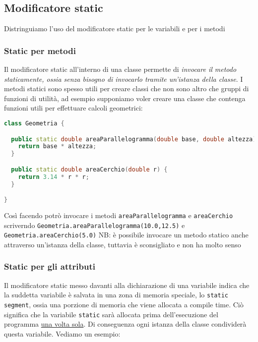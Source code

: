 \subsection{Modificatore static}\label{static}
Distringuiamo l'uso del modificatore static per le variabili e per i metodi

\subsubsection{Static per metodi}
Il modificatore static all'interno di una classe permette di \textit{invocare il metodo staticamente, ossia senza bisogno di invocarlo tramite un'istanza della classe}. I metodi statici sono spesso utili per creare classi che non sono altro che gruppi di funzioni di utilità, ad esempio supponiamo voler creare una classe che contenga funzioni utili per effettuare calcoli geometrici:

\vskip3mm
\begin{lstlisting}[language = c++, frame = none]
class Geometria {

  public static double areaParallelogramma(double base, double altezza) {
    return base * altezza;
  }

  public static double areaCerchio(double r) {
    return 3.14 * r * r;
  }

}
\end{lstlisting}
\vskip3mm
Così facendo potrò invocare i metodi \verb|areaParallelogramma| e \verb|areaCerchio| scriverndo \verb|Geometria.areaParallelogramma(10.0,12.5)| e \verb|Geometria.areaCerchio(5.0)|
\vskip3mm
NB: è possibile invocare un metodo statico anche attraverso un'istanza della classe, tuttavia è sconsigliato e non ha molto senso

\subsubsection{Static per gli attributi}
Il modificatore static messo davanti alla dichiarazione di una variabile indica che la suddetta variabile è salvata in una zona di memoria speciale, lo \verb|static segment|, ossia una porzione di memoria che viene allocata a compile time. Ciò significa che la variabile \verb|static| sarà allocata prima dell'esecuzione del programma \underline{una volta sola}. Di conseguenza ogni istanza della classe condividerà questa variabile. Vediamo un esempio:

